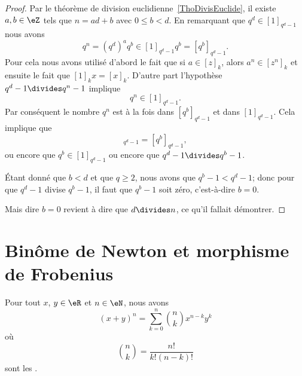 \begin{proof}
	Par le théorème de division euclidienne~\ref{ThoDivisEuclide}, il existe \( a,b\in \eZ\) tels que \( n=ad+b\) avec \( 0\leq b<d\). En remarquant que \( q^d\in[1]_{q^d-1}\) nous avons
	\begin{equation}
		q^n=(q^d)^aq^b\in[1]_{q^d-1}q^b=[q^b]_{q^d-1}.
	\end{equation}
	Pour cela nous avons utilisé d'abord le fait que si \( a\in [z]_k\), alors \( a^n\in[z^n]_k\) et ensuite le fait que \( [1]_kx=[x]_k\). D'autre part l'hypothèse \( q^d-1\divides q^n-1\) implique
	\begin{equation}
		q^n\in[1]_{q^d-1}.
	\end{equation}
	Par conséquent le nombre \( q^n\) est à la fois dans \( [q^b]_{q^d-1}\) et dans \( [1]_{q^d-1}\). Cela implique que
	\begin{equation}
		[1]_{q^d-1}=[q^b]_{q^d-1},
	\end{equation}
	ou encore que \( q^b\in[1]_{q^d-1}\) ou encore que \( q^d-1\divides q^b-1\).

	Étant donné que \( b<d\) et que \( q\geq 2\), nous avons que \( q^b-1<q^d-1\); donc pour que \( q^d-1\) divise \( q^b-1\), il faut que \( q^b-1\) soit zéro, c'est-à-dire \( b=0\).

	Mais dire \( b=0\) revient à dire que \( d\divides n\), ce qu'il fallait démontrer.
\end{proof}

\section{Binôme de Newton et morphisme de Frobenius}

\begin{proposition}     \label{PropBinomFExOiL}
	Pour tout \( x\), \( y\in\eR\) et \( n\in\eN\), nous avons
	\begin{equation}        \label{EqNewtonB}
		(x+y)^n=\sum_{k=0}^n{n\choose k}x^{n-k}y^k
	\end{equation}
	où
	\begin{equation}
		{n\choose k}=\frac{ n! }{ k!(n-k)! }
	\end{equation}
	sont les .
\end{proposition}

